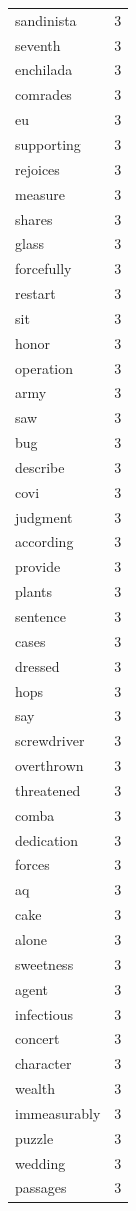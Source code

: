 \begin{tabular}{lr}
sandinista & 3 \\
seventh & 3 \\
enchilada & 3 \\
comrades & 3 \\
eu & 3 \\
supporting & 3 \\
rejoices & 3 \\
measure & 3 \\
shares & 3 \\
glass & 3 \\
forcefully & 3 \\
restart & 3 \\
sit & 3 \\
honor & 3 \\
operation & 3 \\
army & 3 \\
saw & 3 \\
bug & 3 \\
describe & 3 \\
covi & 3 \\
judgment & 3 \\
according & 3 \\
provide & 3 \\
plants & 3 \\
sentence & 3 \\
cases & 3 \\
dressed & 3 \\
hops & 3 \\
say & 3 \\
screwdriver & 3 \\
overthrown & 3 \\
threatened & 3 \\
comba & 3 \\
dedication & 3 \\
forces & 3 \\
aq & 3 \\
cake & 3 \\
alone & 3 \\
sweetness & 3 \\
agent & 3 \\
infectious & 3 \\
concert & 3 \\
character & 3 \\
wealth & 3 \\
immeasurably & 3 \\
puzzle & 3 \\
wedding & 3 \\
passages & 3 \\

\end{tabular}
